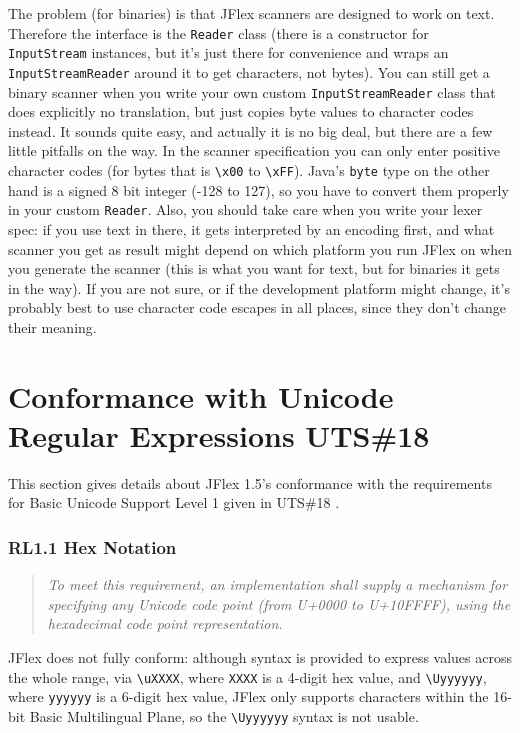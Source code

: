 \documentclass[11pt]{scrartcl}
\newcommand{\ver}{1.5}
\begin{document}
The problem (for binaries) is that JFlex scanners are
designed to work on text. Therefore the interface is
the \texttt{Reader} class (there is a constructor
for \texttt{InputStream} instances, but it's just there
for convenience and wraps an \texttt{InputStreamReader}
around it to get characters, not bytes). 
You can still get a binary scanner when you write 
your own custom \texttt{InputStreamReader} class that
does explicitly no translation, but just copies
byte values to character codes instead. It sounds
quite easy, and actually it is no big deal, but there 
are a few little pitfalls on the way. In the scanner
specification you can only enter positive character
codes (for bytes that is \verb+\x00+
to \verb+\xFF+). Java's \texttt{byte} type on the other hand
is a signed 8 bit integer (-128 to 127), so you have to convert 
them properly in your custom \texttt{Reader}. Also, you should
take care when you write your lexer spec: if you
use text in there, it gets interpreted by an encoding
first, and what scanner you get as result might depend
on which platform you run JFlex on when you generate
the scanner (this is what you want for text, but for binaries it
gets in the way). If you are not sure, or if the development
platform might change, it's probably best to use character 
code escapes in all places, since they don't change their
meaning.

\section{Conformance with Unicode Regular Expressions UTS\#18\label{unicoderegexconformance}}

This section gives details about JFlex \ver's conformance with the
requirements for Basic Unicode Support Level 1 given in UTS\#18
\cite{unicode_rep}.

\subsubsection*{RL1.1 Hex Notation}

\begin{quote}
\emph{To meet this requirement, an implementation shall supply a mechanism
for specifying any Unicode code point (from U+0000 to U+10FFFF), using
the hexadecimal code point representation.}
\end{quote}

JFlex does not fully conform: although syntax is provided to express
values across the whole range, via \verb+\uXXXX+, where \verb+XXXX+ is
a 4-digit hex value, and \verb+\Uyyyyyy+, where \verb+yyyyyy+ is a 
6-digit hex value, JFlex only supports characters within the 16-bit
Basic Multilingual Plane, so the \verb+\Uyyyyyy+ syntax is not usable.
\end{document}
